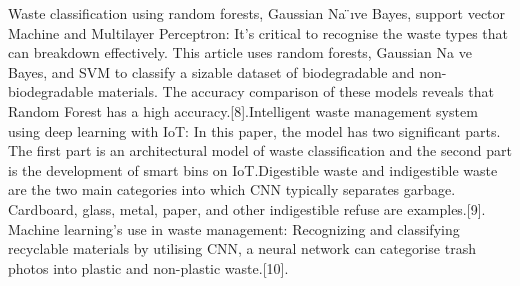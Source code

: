 \hspace{.2cm} Waste classification using random forests, Gaussian Na ̈ıve Bayes, support
vector Machine and Multilayer Perceptron: It's critical to recognise the waste types that can breakdown effectively. This article uses random forests, Gaussian Na ve Bayes, and SVM to classify a sizable dataset of biodegradable and non-biodegradable materials. The accuracy comparison of these models reveals that Random Forest has a high accuracy.[8].Intelligent waste management system
using deep learning with IoT: In this paper, the model has two significant parts.
The first part is an architectural model of waste classification and the second
part is the development of smart bins on IoT.Digestible waste and indigestible waste are the two main categories into which CNN typically separates garbage. Cardboard, glass, metal, paper, and other indigestible refuse are examples.[9]. Machine learning's use in waste management: Recognizing and classifying recyclable materials by utilising CNN, a neural network can categorise trash photos into plastic and non-plastic waste.[10].\\




\\\\


